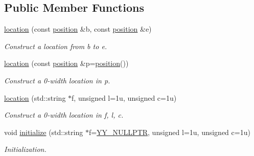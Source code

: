 \subsection*{Public Member Functions}
\begin{DoxyCompactItemize}
\item 
\hyperlink{classyy_1_1location_a0d659c37bcd57075c7bb25e600d3f526}{location} (const \hyperlink{classyy_1_1position}{position} \&b, const \hyperlink{classyy_1_1position}{position} \&e)
\begin{DoxyCompactList}\small\item\em Construct a location from {\itshape b} to {\itshape e}. \end{DoxyCompactList}\item 
\hyperlink{classyy_1_1location_a378c53e8dc67416748f0b12844919e51}{location} (const \hyperlink{classyy_1_1position}{position} \&p=\hyperlink{classyy_1_1position}{position}())
\begin{DoxyCompactList}\small\item\em Construct a 0-\/width location in {\itshape p}. \end{DoxyCompactList}\item 
\hyperlink{classyy_1_1location_a5b27444bd50fbd3648de9bb33e0a28be}{location} (std\-::string $\ast$f, unsigned l=1u, unsigned c=1u)
\begin{DoxyCompactList}\small\item\em Construct a 0-\/width location in {\itshape f}, {\itshape l}, {\itshape c}. \end{DoxyCompactList}\item 
void \hyperlink{classyy_1_1location_a601b0971a35d02545733de0007587e75}{initialize} (std\-::string $\ast$f=\hyperlink{position_8hh_a5a6c82f7ce4ad9cc8c6c08b7a2de5b84}{Y\-Y\-\_\-\-N\-U\-L\-L\-P\-T\-R}, unsigned l=1u, unsigned c=1u)
\begin{DoxyCompactList}\small\item\em Initialization. \end{DoxyCompactList}\end{DoxyCompactItemize}
